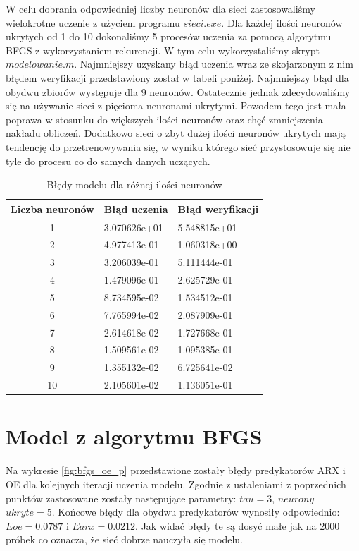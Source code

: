 		W celu dobrania odpowiedniej liczby neuronów dla sieci zastosowaliśmy wielokrotne uczenie z użyciem programu $sieci.exe$. Dla każdej ilości neuronów ukrytych od 1 do 10 dokonaliśmy 5 procesów uczenia za pomocą algorytmu BFGS z wykorzystaniem rekurencji. W tym celu wykorzystaliśmy skrypt $modelowanie.m$. Najmniejszy uzyskany błąd uczenia wraz ze skojarzonym z nim błędem weryfikacji przedstawiony został w tabeli poniżej. Najmniejszy błąd dla obydwu zbiorów występuje dla 9 neuronów. Ostatecznie jednak zdecydowaliśmy się na używanie sieci z pięcioma neuronami ukrytymi. Powodem tego jest mała poprawa w stosunku do większych ilości neuronów oraz chęć zmniejszenia nakładu obliczeń. Dodatkowo sieci o zbyt dużej ilości neuronów ukrytych mają tendencję do przetrenowywania się, w wyniku którego sieć przystosowuje się nie tyle do procesu co do samych danych uczących.
		
		\begin{table}[h!]
			\centering
			\begin{tabular}{c|l|l}
				Liczba neuronów&Błąd uczenia&Błąd weryfikacji\\\hline
				1&3.070626e+01&5.548815e+01\\\hline
				2&4.977413e-01&1.060318e+00\\\hline
				3&3.206039e-01&5.111444e-01\\\hline
				4&1.479096e-01&2.625729e-01\\\hline
				5&8.734595e-02&1.534512e-01\\\hline
				6&7.765994e-02&2.087909e-01\\\hline
				7&2.614618e-02&1.727668e-01\\\hline
				8&1.509561e-02&1.095385e-01\\\hline
				9&1.355132e-02&6.725641e-02\\\hline
				10&2.105601e-02&1.136051e-01\\\hline
			\end{tabular}
		\caption{Błędy modelu dla różnej ilości neuronów}
		\label{tab:neurony}
		\end{table}
		
		\newpage
	\section{Model z algorytmu BFGS}
		\label{sec:bfgs}
		Na wykresie \ref{fig:bfgs_oe_p} przedstawione zostały błędy predykatorów ARX i OE dla kolejnych iteracji uczenia modelu. Zgodnie z ustaleniami z poprzednich punktów zastosowane zostały następujące parametry: $tau = 3$, $neurony$ $ukryte = 5$. Końcowe błędy dla obydwu predykatorów wynosiły odpowiednio: $Eoe = 0.0787$ i $Earx = 0.0212$. Jak widać błędy te są dosyć małe jak na 2000 próbek co oznacza, że sieć dobrze nauczyła się modelu.
		
